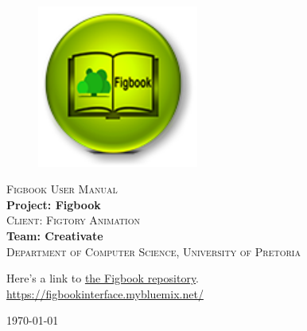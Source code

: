 \begin{titlepage}
	\begin{center}
		
		\begin{figure}[t]
			\centering
			\includegraphics[width=200px]{images/figbooklogo-u216.png}
		\end{figure}
		
		\textsc{\Huge Figbook User Manual} \\ 
		\vspace{2cm}
		\textbf{\Large Project: Figbook} \\ 
		\textsc{\small Client: Figtory Animation} \\ 
		\vspace{2cm}
		\textbf{\large Team: Creativate } \\ 
		
		\textsc{\small Department of Computer Science, University of Pretoria}
		
		\vfill
		
	Here's a link to \href{https://figbookinterface.mybluemix.net/}{the Figbook repository}.\\
	\url{https://figbookinterface.mybluemix.net/}

	\vfill

	{\large \today}	
	
		
		
	\end{center}
\end{titlepage}
